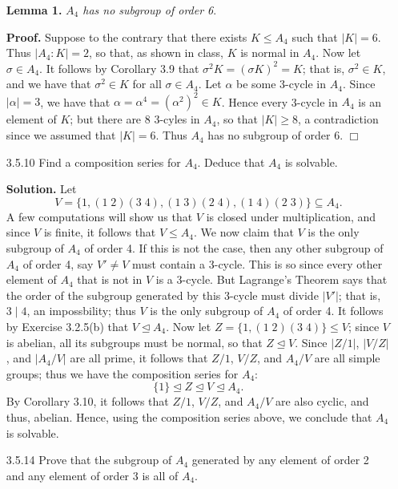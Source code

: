 \documentclass[9pt]{article}
\newcommand{\qed}{\hfill \ensuremath{\Box}}
\begin{document}
\begin{enumerate}
   \item[\textbf{Lemma 1.}] \textit{$A_4$ has no subgroup of order 6}.
   
   \textbf{Proof.} Suppose to the contrary that there exists $K \le A_4$ such 
   that $|K| = 6$. Thus $|A_4 : K| = 2$, so that, as shown in class, $K$ is 
   normal in $A_4$. Now let $\sigma \in A_4$. It follows by Corollary 3.9 that
   $\sigma^2K = (\sigma K)^2 = K$; that is, $\sigma^2 \in K$, and we have that
   $\sigma^2 \in K$ for all $\sigma \in A_4$. Let $\alpha$ be some 3-cycle in
   $A_4$. Since $|\alpha| = 3$, we have that
   $\alpha = \alpha^4 = (\alpha^2)^2 \in K$. Hence every 3-cycle in $A_4$ is
   an element of $K$; but there are 8 3-cyles in $A_4$, so that $|K| \ge 8$,
   a contradiction since we assumed that $|K| = 6$. Thus $A_4$ has no subgroup
   of order 6. \qed
   \item[3.5.10]  Find a composition series for $A_4$. Deduce that $A_4$ is
                  solvable.
                  
      \textbf{Solution.} Let
      $$V = \{1, (1\;2)(3\;4), (1\;3)(2\;4), (1\;4)(2\;3)\} \subseteq A_4.$$
      A few computations will show us that $V$ is closed under multiplication,
      and since $V$ is finite, it follows that $V \le A_4$. We now claim that
      $V$ is the only subgroup of $A_4$ of order 4. If this is not the case,
      then any other subgroup of $A_4$ of order 4, say $V' \neq V$ must contain
      a 3-cycle. This is so since every other element of $A_4$ that is not in
      $V$ is a 3-cycle. But Lagrange's Theorem says that the order of the
      subgroup generated by this 3-cycle must divide $|V'|$; that is,
      $3 \mid 4$, an impossbility; thus $V$ is the only subgroup of $A_4$ of 
      order 4. It follows by Exercise 3.2.5(b) that $V \trianglelefteq A_4$. Now 
      let $Z = \{1, (1\;2)(3\;4)\} \le V$; since $V$ is abelian, all its 
      subgroups must be normal, so that $Z \trianglelefteq V$. Since $|Z/{1}|$, 
      $|V/Z|$, and $|A_4/V|$ are all prime, it follows that $Z/{1}$, $V/Z$, and 
      $A_4/V$ are all simple groups; thus we have the composition series for
      $A_4$:
      $$\{1\} \trianglelefteq Z \trianglelefteq V \trianglelefteq A_4.$$
      By Corollary 3.10, it follows that $Z/{1}$, $V/Z$, and $A_4/V$ are also
      cyclic, and thus, abelian. Hence, using the composition series above, we
      conclude that $A_4$ is solvable.
   \item[3.5.14]  Prove that the subgroup of $A_4$ generated by any element of
                  order 2 and any element of order 3 is all of $A_4$.
                  

\end{enumerate}
\end{document}
